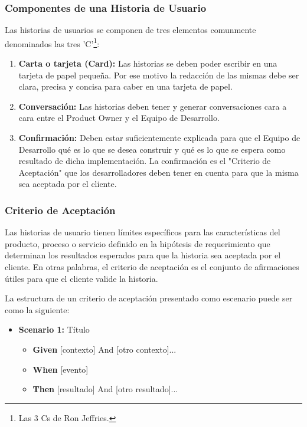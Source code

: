 \subsubsection{Componentes de una Historia de Usuario}

Las historias de usuarios se componen de tres elementos comunmente denominados las tres 'C'\footnote{Las 3 Cs de Ron Jeffries.}:

\begin{enumerate}

\item \textbf{Carta o tarjeta (Card):} Las historias se deben poder escribir en una tarjeta de papel pequeña. Por ese motivo la redacción de las mismas debe ser clara, precisa y concisa para caber en una tarjeta de papel.

\item \textbf{Conversación:} Las historias deben tener y generar conversaciones cara a cara entre el Product Owner y el Equipo de Desarrollo.

\item \textbf{Confirmación:} Deben estar suficientemente explicada para que el Equipo de Desarrollo qué es lo que se desea construir y qué es lo que se espera como resultado de dicha implementación. La confirmación es el "Criterio de Aceptación" que los desarrolladores deben tener en cuenta para que la misma sea aceptada por el cliente.

\end{enumerate}

\subsubsection{Criterio de Aceptación}

Las historias de usuario tienen límites específicos para las características del producto, proceso o servicio definido en la hipótesis de requerimiento que determinan los resultados esperados para que la historia sea aceptada por el cliente. En otras palabras, el criterio de aceptación es el conjunto de afirmaciones útiles para que el cliente valide la historia.

La estructura de un criterio de aceptación presentado como escenario puede ser como la siguiente:

\begin{itemize}
\item \textbf{Scenario 1:} Título
  \begin{itemize}
  \item \textbf{Given} [contexto] And [otro contexto]...
  \item \textbf{When}  [evento] 
  \item \textbf{Then}  [resultado] And [otro resultado]...
  \end{itemize}
\end{itemize}
  
